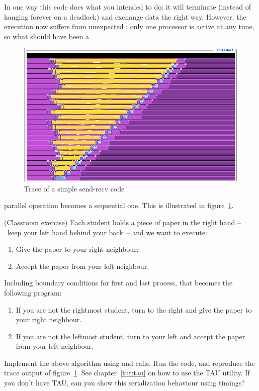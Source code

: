 In one way this code does what you intended to do:
it will terminate (instead of hanging forever on a
deadlock) and exchange data the right way. However, the execution
now suffers from unexpected : only
one processor is active at any time, so what should have been a
%
\begin{figure}[ht]
\includegraphics[scale=.4]{graphics/linear-serial}
\caption{Trace of a simple send-recv code}
\label{fig:serialization}
\end{figure}
%
parallel operation becomes a sequential one. This is illustrated in
figure~\ref{fig:serialization}.
\begin{exercise}
  \label{ex:serialsend}
  (Classroom exercise) Each student holds a piece of paper
  in the right hand --~keep your left hand behind your back~--
  and we want to execute:
  \begin{enumerate}
  \item Give the paper to your right neighbour;
  \item Accept the paper from your left neighbour.
  \end{enumerate}
  Including boundary conditions for first and last process, that becomes
  the following program:
  \begin{enumerate}
  \item If you are not the rightmost student, turn to the right
    and give the paper to your right neighbour.
  \item If you are not the leftmost student, turn to your left and
    accept the paper from your left neighbour.
  \end{enumerate}
\end{exercise}

\begin{exercise}
  \label{ex:linear-sequential}
  Implement the above algorithm using  and  calls.
  Run the code, and reproduce the trace output 
  of figure~\ref{fig:serialization}. See chapter~\ref{tut:tau}
  on how to use the TAU utility. If you don't have TAU, can you show this serialization
  behaviour using timings?
\end{exercise}

